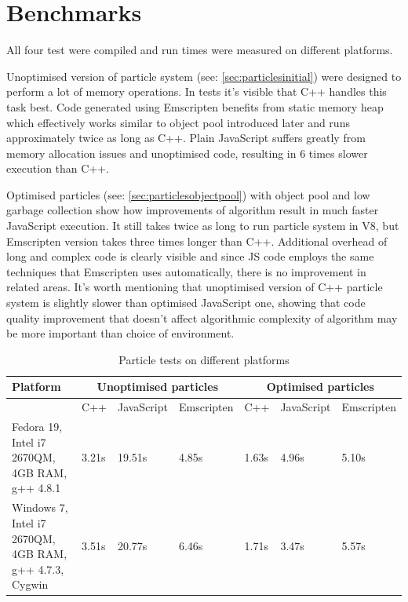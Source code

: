 \section{Benchmarks}
\label{sec:embenchmarks}

All four test were compiled and run times were measured on different platforms.

Unoptimised version of particle system (see: \ref{sec:particlesinitial}) were designed to perform a lot of memory operations. In tests it's visible that C++ handles this task best. Code generated using Emscripten benefits from static memory heap which effectively works similar to object pool introduced later and runs approximately twice as long as C++. Plain JavaScript suffers greatly from memory allocation issues and unoptimised code, resulting in 6 times slower execution than C++.

Optimised particles (see: \ref{sec:particlesobjectpool}) with object pool and low garbage collection show how improvements of algorithm result in much faster JavaScript execution. It still takes twice as long to run particle system in V8, but Emscripten version takes three times longer than C++. Additional overhead of long and complex code is clearly visible and since JS code employs the same techniques that Emscripten uses automatically, there is no improvement in related areas. It's worth mentioning that unoptimised version of C++ particle system is slightly slower than optimised JavaScript one, showing that code quality improvement that doesn't affect algorithmic complexity of algorithm may be more important than choice of environment.

\begin{table}[h!]
\caption{Particle tests on different platforms}
\label{table:benchmarks}
\begin{tabular}{|p{4cm}||l|l|l||l|l|l|}
  	\hline
   Platform & \multicolumn{3}{c}{Unoptimised particles} & \multicolumn{3}{c}{Optimised particles}\\ \hline
   & C++ & JavaScript & Emscripten & C++ & JavaScript & Emscripten\\ \hline
   Fedora 19, Intel i7 2670QM, 4GB RAM, g++ 4.8.1 & 3.21s & 19.51s & 4.85s & 1.63s & 4.96s & 5.10s \\ \hline
   Windows 7, Intel i7 2670QM, 4GB RAM, g++ 4.7.3, Cygwin & 3.51s & 20.77s & 6.46s & 1.71s & 3.47s & 5.57s \\ \hline
\end{tabular}
\end{table}

